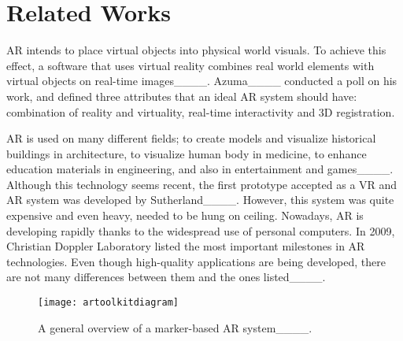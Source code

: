 \section{Related Works}
AR intends to place virtual objects into physical world visuals. To achieve this effect, a software that uses virtual reality combines real world elements with virtual objects on real-time images____. Azuma____ conducted a poll on his work, and defined three attributes that an ideal AR system should have: combination of reality and virtuality, real-time interactivity and 3D registration.

AR is used on many different fields; to create models and visualize historical buildings in architecture, to visualize human body in medicine, to enhance education materials in engineering, and also in entertainment and games____. Although this technology seems recent, the first prototype accepted as a VR and AR system was developed by Sutherland____. However, this system was quite expensive and even heavy, needed to be hung on ceiling. Nowadays, AR is developing rapidly thanks to the widespread use of personal computers. In 2009, Christian Doppler Laboratory listed the most important milestones in AR technologies. Even though high-quality applications are being developed, there are not many differences between them and the ones listed____.
\begin{figure*}[t]
  \centering
  \texttt{[image: artoolkitdiagram]}
  \caption{ \label{fig:arsystem}
          A general overview of a marker-based AR system____.
           }
\end{figure*}